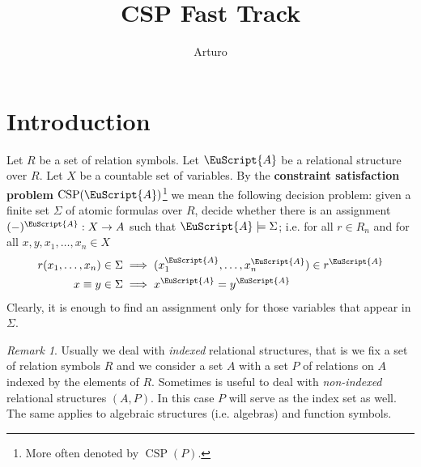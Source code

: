 \documentclass{amsart}
\theoremstyle{plain}
\theoremstyle{definition}
\theoremstyle{remark}
\newtheorem{remark}[theorem]{Remark}
\DeclareMathOperator{\CSP}{CSP}
\begin{document}
\title{CSP Fast Track}
\author{Arturo}

\maketitle

\section{Introduction}
Let $R$ be a set of relation symbols. 
Let $\EuScript{A}
$ be a relational structure over $R$.
Let $X$ be a countable set of variables. 
By the \textbf{constraint satisfaction problem} $\CSP(\EuScript{A})$\footnote{More often denoted by $\CSP(P)$.} we mean the following decision problem: 
given a finite set $\Sigma$ of atomic formulas over $R$, decide whether there is 
an assignment $(-)^{\EuScript{A}} : X \to A$ such that 
$\EuScript{A} \models \Sigma$; 
i.e. for all $r \in R_n$ and for all $x,y,x_1, \ldots, x_n \in X$ 
\begin{align}
    r(x_1, \ldots, x_n) \in \Sigma & \implies  (x_1^{{\EuScript{A}}}, \ldots, x_n^{{\EuScript{A}}}) \in r^{\EuScript{A}} \\
    x \equiv y \in \Sigma & \implies x^{{\EuScript{A}}} = y^{{\EuScript{A}}}
\end{align}
Clearly, it is enough to find an assignment only for those variables that appear in $\Sigma$. 

\begin{remark}
    Usually we deal with \emph{indexed} relational structures, 
    that is we fix a set of relation symbols $R$ and we consider a set $A$ with a set $P$ of relations on $A$ indexed by the elements of $R$. 
    Sometimes is useful to deal with \emph{non-indexed} relational structures $(A,P)$. 
    In this case $P$ will serve as the index set as well. 
    The same applies to algebraic structures (i.e. algebras) and function symbols.  
\end{remark}

\end{document}
